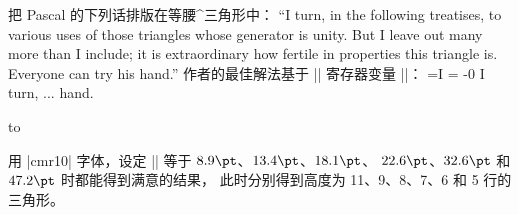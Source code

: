 \ddangerexercise 把 Pascal 的下列话排版在等腰^{三角形}中：\1
``I turn, in the following treatises, to various uses of those
    triangles whose generator is unity. But I leave out many more
    than I include; it is extraordinary how fertile in properties
    this triangle is. Everyone can try his hand.''
\answer 作者的最佳解法基于 |\dimen| 寄存器变量 |\x|：
\begintt
{}=\hbox{I}
=\vbox{ -0\x
  \ifdim \x>2em \rightskip=-\wd1
  \else \frenchspacing \rightskip=-\wd1 plus1pt minus1pt
   \leftskip=0pt plus 1pt minus1pt \fi
  \parfillskip=0pt  \noindent I turn, ... hand.}
\centerline{\hbox to }
\endtt
用 |cmr10| 字体，设定 |\x| 等于 $8.9\pt$、$13.4\pt$、$18.1\pt$、
$22.6\pt$、$32.6\pt$ 和 $47.2\pt$ 时都能得到满意的结果，
此时分别得到高度为 11、9、8、7、6 和 5 行的三角形。

